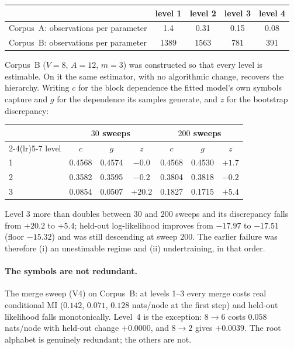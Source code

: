 \documentclass[11pt,a4paper]{article}
\theoremstyle{plain}
\theoremstyle{definition}
\begin{document}
\begin{center}
\begin{tabular}{lcccc}
\toprule
 & level 1 & level 2 & level 3 & level 4 \\
\midrule
Corpus~A: observations per parameter & 1.4 & 0.31 & 0.15 & 0.08 \\
Corpus~B: observations per parameter & 1389 & 1563 & 781 & 391 \\
\bottomrule
\end{tabular}
\end{center}

\noindent
Corpus~B ($V=8$, $A=12$, $m=3$) was constructed so that every level is
estimable. On it the same estimator, with no algorithmic change, recovers the
hierarchy. Writing $c$ for the block dependence the fitted model's own symbols
capture and $g$ for the dependence its samples generate, and $z$ for the
bootstrap discrepancy:

\begin{center}
\begin{tabular}{lcccccc}
\toprule
 & \multicolumn{3}{c}{$30$ sweeps} & \multicolumn{3}{c}{$200$ sweeps} \\
\cmidrule(lr){2-4}\cmidrule(lr){5-7}
level & $c$ & $g$ & $z$ & $c$ & $g$ & $z$ \\
\midrule
1 & 0.4568 & 0.4574 & $-0.0$ & 0.4568 & 0.4530 & $+1.7$ \\
2 & 0.3582 & 0.3595 & $-0.2$ & 0.3804 & 0.3818 & $-0.2$ \\
3 & 0.0854 & 0.0507 & $+20.2$ & 0.1827 & 0.1715 & $+5.4$ \\
\bottomrule
\end{tabular}
\end{center}

\noindent
Level 3 more than doubles between $30$ and $200$ sweeps and its discrepancy
falls from $+20.2$ to $+5.4$; held-out log-likelihood improves from $-17.97$ to
$-17.51$ (floor $-15.32$) and was still descending at sweep $200$. The earlier
failure was therefore (i) an unestimable regime and (ii) undertraining, in that
order.

\paragraph{The symbols are not redundant.}
The merge sweep (V4) on Corpus~B: at levels 1--3 every merge costs real
conditional MI ($0.142$, $0.071$, $0.128$ nats/node at the first step) and
held-out likelihood falls monotonically. Level~4 is the exception: $8\to6$
costs $0.058$ nats/node with held-out change $+0.0000$, and $8\to2$ gives
$+0.0039$. The root alphabet is genuinely redundant; the others are not.
\end{document}
